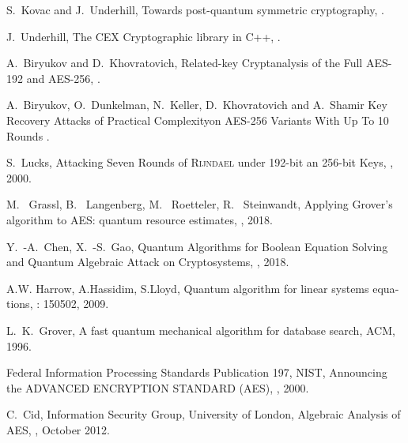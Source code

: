 \documentclass[a4paper,11pt]{article}
\begin{document}
\begin{otherlanguage}{english}
\begin{thebibliography}{1}
S.~Kovac and J.~Underhill,
\newblock Towards post-quantum symmetric cryptography,
.

J.~Underhill,
\newblock The CEX Cryptographic library in C++,
.

A.~Biryukov and D.~Khovratovich,
\newblock Related-key Cryptanalysis of the Full AES-192 and AES-256,
.

A.~Biryukov, O.~Dunkelman, N.~Keller, D.~Khovratovich and A.~Shamir
\newblock Key Recovery Attacks of Practical Complexityon AES-256 Variants With Up To 10 Rounds
.

S.~Lucks,
\newblock Attacking Seven Rounds of \textsc{Rijndael} under 192-bit an 256-bit Keys,
, 2000.

M.~ Grassl, B.~ Langenberg, M.~ Roetteler, R.~ Steinwandt,
\newblock Applying Grover’s algorithm to AES: quantum resource estimates,
, 2018.

Y.~-A.~Chen, X.~-S.~Gao,
\newblock Quantum Algorithms for Boolean Equation Solving and Quantum Algebraic Attack on Cryptosystems,
, 2018.

A.W. Harrow, A.Hassidim, S.Lloyd, 
  \newblock Quantum algorithm for linear systems equations, 
  : 150502, 2009. 

L.~K.~Grover,
\newblock A fast quantum mechanical algorithm for database search, 
 ACM, 1996.

Federal Information Processing Standards Publication 197, NIST,
\newblock Announcing the ADVANCED ENCRYPTION STANDARD (AES),
, 2000.

C.~Cid, Information Security Group, University of London,
\newblock Algebraic Analysis of AES,
, October 2012.


\end{thebibliography}
\end{otherlanguage}
\end{document}
